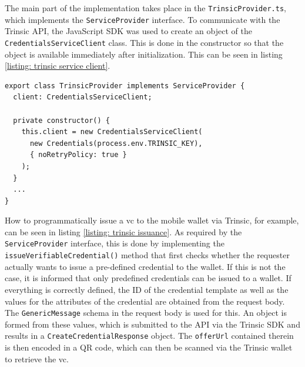         The main part of the implementation takes place in the \texttt{TrinsicProvider.ts}, which implements the \texttt{ServiceProvider} interface. To communicate with the Trinsic API, the JavaScript SDK was used to create an object of the \texttt{CredentialsServiceClient} class. This is done in the constructor so that the object is available immediately after initialization. This can be seen in listing \ref{listing: trinsic service client}.
    \newpage
    \begin{lstlisting}[style=ES6, caption=Connecting to Trinsic API via SDK, label={listing: trinsic service client}]
export class TrinsicProvider implements ServiceProvider {
  client: CredentialsServiceClient;

  private constructor() {
    this.client = new CredentialsServiceClient(
      new Credentials(process.env.TRINSIC_KEY), 
      { noRetryPolicy: true }
    );
  }
  ...
}\end{lstlisting}
    
    How to programmatically issue a \ac{vc} to the mobile wallet via Trinsic, for example, can be seen in listing \ref{listing: trinsic issuance}. As required by the \texttt{ServiceProvider} interface, this is done by implementing the \texttt{issueVerifiableCredential()} method that first checks whether the requester actually wants to issue a pre-defined credential to the wallet. If this is not the case, it is informed that only predefined credentials can be issued to a wallet. If everything is correctly defined, the ID of the credential template as well as the values for the attributes of the credential are obtained from the request body. The \texttt{GenericMessage} schema in the request body is used for this. An object is formed from these values, which is submitted to the API via the Trinsic SDK and results in a \texttt{CreateCredentialResponse} object. The \texttt{offerUrl} contained therein is then encoded in a QR code, which can then be scanned via the Trinsic wallet to retrieve the \ac{vc}. 
    \newline
    

